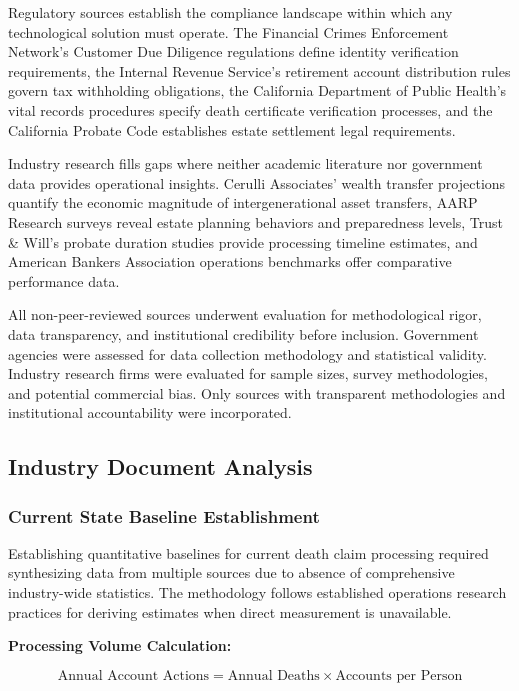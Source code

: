 Regulatory sources establish the compliance landscape within which any technological solution must operate. The Financial Crimes Enforcement Network's Customer Due Diligence regulations define identity verification requirements, the Internal Revenue Service's retirement account distribution rules govern tax withholding obligations, the California Department of Public Health's vital records procedures specify death certificate verification processes, and the California Probate Code establishes estate settlement legal requirements.

Industry research fills gaps where neither academic literature nor government data provides operational insights. Cerulli Associates' wealth transfer projections quantify the economic magnitude of intergenerational asset transfers, AARP Research surveys reveal estate planning behaviors and preparedness levels, Trust \& Will's probate duration studies provide processing timeline estimates, and American Bankers Association operations benchmarks offer comparative performance data.

All non-peer-reviewed sources underwent evaluation for methodological rigor, data transparency, and institutional credibility before inclusion. Government agencies were assessed for data collection methodology and statistical validity. Industry research firms were evaluated for sample sizes, survey methodologies, and potential commercial bias. Only sources with transparent methodologies and institutional accountability were incorporated.

\subsection{Industry Document Analysis}

\subsubsection{Current State Baseline Establishment}

Establishing quantitative baselines for current death claim processing required synthesizing data from multiple sources due to absence of comprehensive industry-wide statistics. The methodology follows established operations research practices for deriving estimates when direct measurement is unavailable.

\textbf{Processing Volume Calculation:}

\begin{equation}
\text{Annual Account Actions} = \text{Annual Deaths} \times \text{Accounts per Person}
\end{equation}

